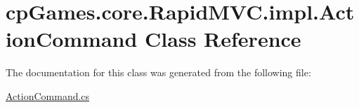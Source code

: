 \hypertarget{classcp_games_1_1core_1_1_rapid_m_v_c_1_1impl_1_1_action_command}{}\section{cp\+Games.\+core.\+Rapid\+M\+V\+C.\+impl.\+Action\+Command Class Reference}
\label{classcp_games_1_1core_1_1_rapid_m_v_c_1_1impl_1_1_action_command}


The documentation for this class was generated from the following file\+:\begin{DoxyCompactItemize}
\item 
\mbox{\hyperlink{_action_command_8cs}{Action\+Command.\+cs}}\end{DoxyCompactItemize}
